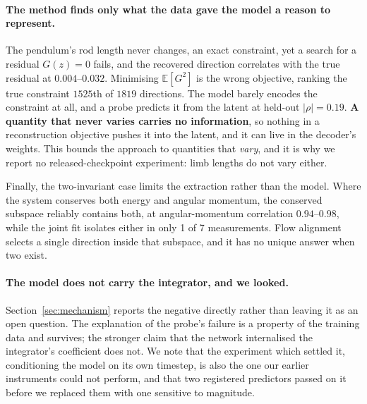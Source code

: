 \paragraph{The method finds only what the data gave the model a reason to represent.}
The pendulum's rod length never changes, an exact constraint, yet a search for a residual $G(z)=0$
fails, and the recovered direction correlates with the true residual at $0.004$--$0.032$. Minimising
$\mathbb{E}[G^2]$ is the wrong objective, ranking the true constraint $1525$th of $1819$ directions.
The model barely encodes the constraint at all, and a probe predicts it from the latent at held-out
$|\rho|=0.19$. \textbf{A quantity that never varies carries no information}, so nothing in a
reconstruction objective pushes it into the latent, and it can live in the decoder's weights. This
bounds the approach to quantities that \emph{vary}, and it is why we report no released-checkpoint
experiment: limb lengths do not vary either.

Finally, the two-invariant case limits the extraction rather than the model. Where the system
conserves both energy and angular momentum, the conserved subspace reliably contains both, at
angular-momentum correlation $0.94$--$0.98$, while the joint fit isolates either in only 1 of 7
measurements. Flow alignment selects a single direction inside that subspace, and it has no unique
answer when two exist.

\paragraph{The model does not carry the integrator, and we looked.}
Section~\ref{sec:mechanism} reports the negative directly rather than leaving it as an open question.
The explanation of the probe's failure is a property of the training data and survives; the stronger
claim that the network internalised the integrator's coefficient does not. We note that the
experiment which settled it, conditioning the model on its own timestep, is also the one our earlier
instruments could not perform, and that two registered predictors passed on it before we replaced
them with one sensitive to magnitude.

